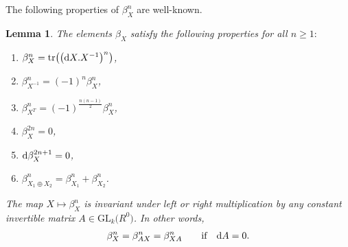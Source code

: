 \documentclass[pdftex]{sigma}%
\newtheorem{lem}[thm]{Lemma}
\numberwithin{equation}{section}
\newcommand{\tr}{\mathrm{tr}}
\newcommand{\GL}{\mathrm{GL}}
\newcommand{\0}{\color{blue}{\mathsf{0}}}
\begin{document}
 The following properties of $\beta^n_X$ are well-known.

 \begin{lem} \label{lem: BasicPropertiesBeta}
 The elements $\beta_X$ satisfy the following properties for all $n\geq 1{:}$
\begin{enumerate}\itemsep=0pt
\item[$(i)$] $\beta_X^n = \tr \big( \big({\rm d}X. X^{-1}\big)^n\big)$,
\item[$(ii)$] $\beta_{X^{-1}}^n = (-1)^n \beta_{X}^n$,
\item[$(iii)$] $\beta_{X^T}^n = (-1)^{\frac{n(n-1)}{2}} \beta_{X}^n$,
\item[$(iv)$] $\beta_{X}^{2n} =0$,
\item[$(v)$] ${\rm d}\beta_{X}^{2n+1} =0$,
\item[$(vi)$] $\beta_{X_1 \oplus X_2}^{n} =\beta_{X_1}^{n} + \beta_{X_2}^n$.
\end{enumerate}
 The map $X\mapsto \beta^n_X$ is invariant under left or right multiplication by any constant invertible matrix $A \in \GL_k\big(R^0\big)$. In other words,
 \begin{gather*}
 \beta^n_X= \beta^n_{AX} = \beta^n_{XA} \qquad \text{if} \quad {\rm d}A=0 .
 \end{gather*}
 \end{lem}
\end{document}
